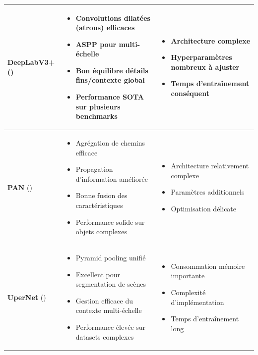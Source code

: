 \begin{longtable}{|p{2.2cm}|p{6cm}|p{6cm}|}
\textbf{DeepLabV3+} (\citeyear{chen_encoder-decoder_2018}) \cite{chen_encoder-decoder_2018} & 
\begin{itemize}[leftmargin=0.4cm]
    \item Convolutions dilatées (atrous) efficaces
    \item ASPP pour multi-échelle
    \item Bon équilibre détails fins/contexte global
    \item Performance SOTA sur plusieurs benchmarks
\end{itemize} & 
\begin{itemize}[leftmargin=0.4cm]
    \item Architecture complexe
    \item Hyperparamètres nombreux à ajuster
    \item Temps d'entraînement conséquent
\end{itemize} \\
\hline

\textbf{PAN}  (\citeyear{liu_path_2018}) \cite{liu_path_2018} & 
\begin{itemize}[leftmargin=0.4cm]
    \item Agrégation de chemins efficace
    \item Propagation d'information améliorée
    \item Bonne fusion des caractéristiques
    \item Performance solide sur objets complexes
\end{itemize} & 
\begin{itemize}[leftmargin=0.4cm]
    \item Architecture relativement complexe
    \item Paramètres additionnels
    \item Optimisation délicate
\end{itemize} \\
\hline

\textbf{UperNet} (\citeyear{xiao_unified_2018}) \cite{xiao_unified_2018} & 
\begin{itemize}[leftmargin=0.4cm]
    \item Pyramid pooling unifié
    \item Excellent pour segmentation de scènes
    \item Gestion efficace du contexte multi-échelle
    \item Performance élevée sur datasets complexes
\end{itemize} & 
\begin{itemize}[leftmargin=0.4cm]
    \item Consommation mémoire importante
    \item Complexité d'implémentation
    \item Temps d'entraînement long
\end{itemize} \\
\hline


\end{longtable}
